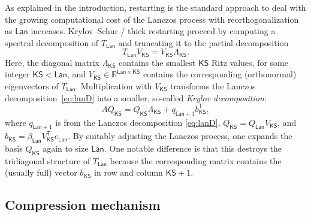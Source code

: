 \documentclass{siamart190516}
\newcommand{\Ttran}{\mathsf{T}}
\newcommand{\lan}{\mathsf{Lan}}
\newcommand{\ks}{\mathsf{KS}}
\newcommand{\R}{\mathbb{R}}
\begin{document}
As explained in the introduction, restarting is the standard approach to deal with the growing computational cost of the Lanczos process with reorthogonalization as $\lan$ increases. Krylov--Schur / thick restarting proceed by computing a spectral decomposition of $T_{\lan}$ and truncating it to the partial decomposition \[ T_{\lan}V_{\ks} = V_{\ks}\Lambda_{\ks}.\] Here, the diagonal matrix $\Lambda_{\ks}$ contains the smallest $\ks$ Ritz values, for some integer $\ks < \lan$, and $V_{\ks} \in \R^{\lan\times \ks}$ contains the corresponding (orthonormal) eigenvectors of $T_{\lan}$. 
Multiplication with $V_{\ks}$ transforms the Lanczos decomposition~\eqref{eq:lanD} into a smaller, so-called \emph{Krylov decomposition}:
\begin{equation}
    \label{eq:KrylovD}
    AQ_{\ks} = Q_{\ks}\Lambda_{\ks}+q_{\lan+1}b_{\ks}^{\Ttran},
\end{equation}
where $q_{\lan+1}$ is from the Lanczos decomposition \cref{eq:lanD},
$Q_{\ks} = Q_{\lan}V_{\ks}$, and $b_{\ks} = \beta_{\lan}V_{\ks}^{\Ttran}e_{\lan}$. 
By suitably adjusting the Lanczos process, one expands the basis $Q_{\ks}$ again to size $\lan$. One notable difference is that this destroys the tridiagonal structure of $T_{\lan}$ because the corresponding matrix contains the (usually full) vector $b_{\ks}$ in row and column $\ks+1$.

\subsection{Compression mechanism}
\label{sec:restart}
\end{document}
